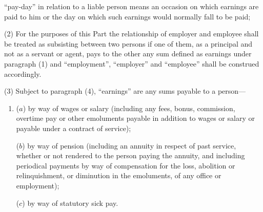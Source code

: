 \documentclass[12pt,a4paper]{article}
\begin{document}
\begin{enumerate}
“pay-day” in relation to a liable person means an occasion on which earnings are paid to him or the day on which such earnings would normally fall to be paid;




\end{enumerate}

(2) For the purposes of this Part the relationship of employer and employee shall be treated as subsisting between two persons if one of them, as a principal and not as a servant or agent, pays to the other any sum defined as earnings under paragraph (1) and “employment”, “employer” and “employee” shall be construed accordingly.

(3) Subject to paragraph (4), “earnings” are any sums payable to a person—
\begin{enumerate}\item[]
($a$) by way of wages or salary (including any fees, bonus, commission, overtime pay or other emoluments payable in addition to wages or salary or payable under a contract of service);

($b$) by way of pension (including an annuity in respect of past service, whether or not rendered to the person paying the annuity, and including periodical payments by way of compensation for the loss, abolition or relinquishment, or diminution in the emoluments, of any office or employment);

($c$) by way of statutory sick pay.
\end{enumerate}
\end{document}
